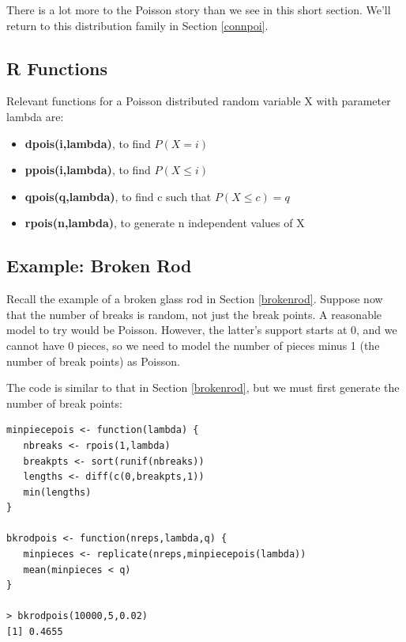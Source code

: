 There is a lot more to the Poisson story than we see in this short
section.  We'll return to this distribution family in Section
\ref{connpoi}. 

\subsection{R Functions}

Relevant functions for a Poisson distributed random variable X
with parameter lambda are:

\begin{itemize}

\item {\bf dpois(i,lambda)}, to find $P(X = i)$

\item {\bf ppois(i,lambda)}, to find $P(X \leq i)$

\item {\bf qpois(q,lambda)}, to find c such that $P(X \leq c) = q$

\item {\bf rpois(n,lambda)}, to generate n independent values of X

\end{itemize}

\subsection{Example: Broken Rod}

Recall the example of a broken glass rod in Section \ref{brokenrod}.
Suppose now that the number of breaks is random, not just the break
points.  A reasonable model to try would be Poisson.  However, 
the latter's support starts at 0, and we cannot have 0 pieces,
so we need to model the number of pieces minus 1 (the number of break
points) as Poisson.

The code is similar to that in Section \ref{brokenrod}, but we must
first generate the number of break points:

\begin{lstlisting}
minpiecepois <- function(lambda) {
   nbreaks <- rpois(1,lambda)
   breakpts <- sort(runif(nbreaks))
   lengths <- diff(c(0,breakpts,1))
   min(lengths)
}

bkrodpois <- function(nreps,lambda,q) {
   minpieces <- replicate(nreps,minpiecepois(lambda))
   mean(minpieces < q) 
}

> bkrodpois(10000,5,0.02)  
[1] 0.4655
\end{lstlisting}

